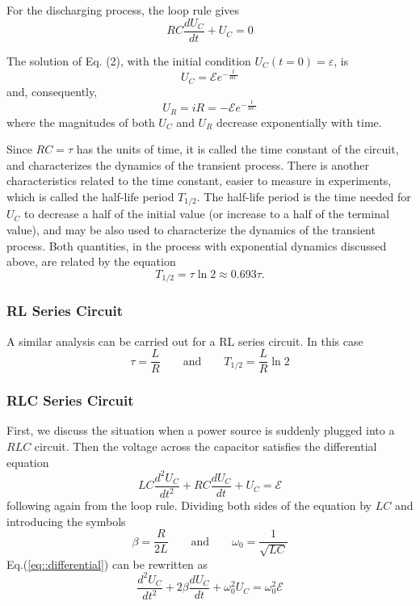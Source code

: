 \documentclass[a4paper]{article}
\begin{document}
For the discharging process, the loop rule gives
\begin{equation}
	RC\frac{dU_C}{dt}+U_C=0
\end{equation}

The solution of Eq. (2), with the initial condition $U_C(t=0)=\varepsilon$, is
$$U_C=\mathcal{E} e^{-\frac{t}{RC}}$$
and, consequently,
$$U_R=iR=-\mathcal{E} e^{-\frac{t}{RC}}$$
where the magnitudes of both $U_C$ and $U_R$ decrease exponentially with time.

Since $RC = \tau$ has the units of time, it is called the time constant of the circuit, and characterizes the dynamics of the transient process. There is another characteristics related to the time constant, easier to measure in experiments, which is called the half-life period $T_{1/2}$. The half-life period is the time needed for $U_C$ to decrease a half of the initial value (or increase to a half of the terminal value), and may be also used to characterize the dynamics of the transient process. Both quantities, in the process with exponential dynamics discussed above, are related by the equation
$$T_{1/2}=\tau\ln2\approx0.693\tau.$$

\subsubsection{RL Series Circuit}

A similar analysis can be carried out for a RL series circuit. In this case
$$\tau=\frac{L}{R}\qquad \mathrm{and}\qquad T_{1/2}=\frac{L}{R}\ln2$$

\subsubsection{RLC Series Circuit}

First, we discuss the situation when a power source is suddenly plugged into a $RLC$ circuit. Then the voltage across the capacitor satisfies the differential equation
\begin{equation}
	LC\frac{d^2U_C}{dt^2}+RC\frac{dU_C}{dt}+U_C=\mathcal{E}
	\label{eq::differential}
\end{equation}
following again from the loop rule. Dividing both sides of the equation by $LC$ and introducing the symbols
$$
	\beta=\frac{R}{2L}\qquad \mathrm{and} \qquad \omega_0=\frac{1}{\sqrt{LC}}
$$
Eq.(\ref{eq::differential}) can be rewritten as
\begin{equation}
	\frac{d^2U_C}{dt^2}+2\beta\frac{dU_C}{dt}+\omega_0^2U_C=\omega_0^2\mathcal{E}
	\label{eq::differential_simplified}
\end{equation}
\end{document}
